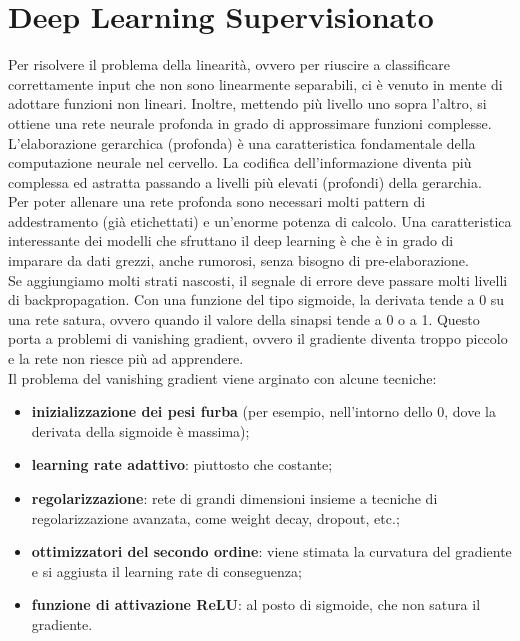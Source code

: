 \section{Deep Learning Supervisionato}

Per risolvere il problema della linearità, ovvero per riuscire a classificare
correttamente input che non sono linearmente separabili, ci è venuto in mente di
adottare funzioni non lineari.
Inoltre, mettendo più livello uno sopra l'altro, si ottiene una rete neurale profonda in
grado di approssimare funzioni complesse.\\
L'elaborazione gerarchica (profonda) è una caratteristica fondamentale della
computazione neurale nel cervello. La codifica dell'informazione diventa più
complessa ed astratta passando a livelli più elevati (profondi) della
gerarchia.\\
Per poter allenare una rete profonda sono necessari molti
pattern di addestramento (già etichettati) e un'enorme potenza di calcolo. Una
caratteristica interessante dei modelli che sfruttano il deep learning è che è
in grado di imparare da dati grezzi, anche rumorosi, senza bisogno di
pre-elaborazione.\\
Se aggiungiamo molti strati nascosti, il segnale di errore deve passare molti
livelli di backpropagation. Con una funzione del tipo sigmoide, la derivata
tende a 0 su una rete satura, ovvero quando il valore della sinapsi tende a 0 o
a 1. Questo porta a problemi di vanishing gradient, ovvero il gradiente diventa
troppo piccolo e la rete non riesce più ad apprendere.\\
Il problema del vanishing gradient viene arginato con alcune tecniche:
\begin{itemize}
	\item \textbf{inizializzazione dei pesi furba} (per esempio, nell'intorno dello 0,
		dove la derivata della sigmoide è massima);

	\item \textbf{learning rate adattivo}: piuttosto che costante;

	\item \textbf{regolarizzazione}: rete di grandi dimensioni insieme a 
		tecniche di regolarizzazione avanzata, come weight decay, dropout, etc.;

	\item \textbf{ottimizzatori del secondo ordine}: viene stimata la curvatura del
		gradiente e si aggiusta il learning rate di conseguenza;

	\item \textbf{funzione di attivazione ReLU}: al posto di sigmoide, che non satura il 
		gradiente.
\end{itemize}

